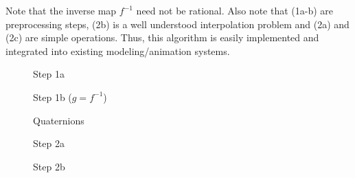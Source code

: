 Note that the inverse map $f^{-1}$ need not be rational.
Also note that (1a-b) are preprocessing steps,
(2b) is a well understood interpolation problem
and (2a) and (2c) are simple operations.
Thus, this algorithm is easily implemented and integrated into
existing modeling/animation systems.

\clearpage
\twocolumn

\begin{figure}
\vspace{2in}
\caption{Step 1a}
\label{fig:alg1a}
\end{figure}

\begin{figure}
\vspace{2in}
\caption{Step 1b ($g=f^{-1}$)}
\label{fig:alg1b}
\end{figure}

\begin{figure}
\vspace{2in}
\caption{Quaternions}
\label{fig:algdata}
\end{figure}

\begin{figure}
\vspace{2in}
\caption{Step 2a}
\label{fig:alg2a}
\end{figure}

\begin{figure}
\vspace{2in}
\caption{Step 2b}
\label{fig:alg2b}
\end{figure}

